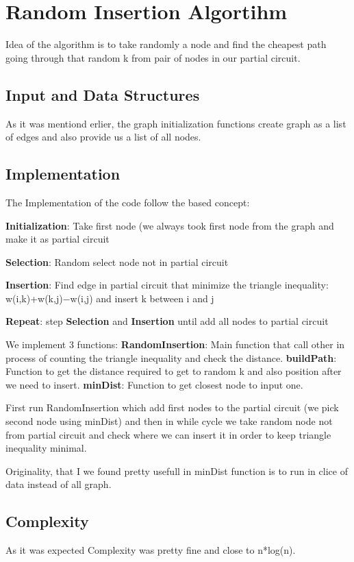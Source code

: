 \section{Random Insertion Algortihm}\label{randominsertion}
Idea of the algorithm is to take randomly a node and find the cheapest path going through that random k from pair of nodes in our partial circuit. 

\subsection{Input and Data Structures}
As it was mentiond erlier, the graph initialization functions create graph as a list of edges and also provide us a list of all nodes.

\subsection{Implementation}
The Implementation of the code follow the based concept:

\begin{itemized}
    \item \textbf{Initialization}: Take first node (we always took first node from the graph and make it as partial circuit
    \item \textbf{Selection}: Random select node not in partial circuit
    \item \textbf{Insertion}: Find edge in partial circuit that minimize the triangle inequality: w(i,k)+w(k,j)−w(i,j) and insert k between i and j
    \item \textbf{Repeat}: step \textbf{Selection} and \textbf{Insertion} until add all nodes to partial circuit
\end{itemized}

We implement 3 functions: 
\textbf{RandomInsertion}: Main function that call other in process of counting the triangle inequality and check the distance.
\textbf{buildPath}: Function to get the distance required to get to random k and also position after we need to insert. 
\textbf{minDist}: Function to get closest node to input one.

First run RandomInsertion which add first nodes to the partial circuit (we pick second node using minDist) and then in while cycle we take random node not from partial circuit and check where we can insert it in order to keep triangle inequality minimal.

Originality, that I we found pretty usefull in minDist function is to run in clice of data instead of all graph.
\subsection{Complexity}

As it was expected Complexity was pretty fine and close to n*log(n).


\pagebreak